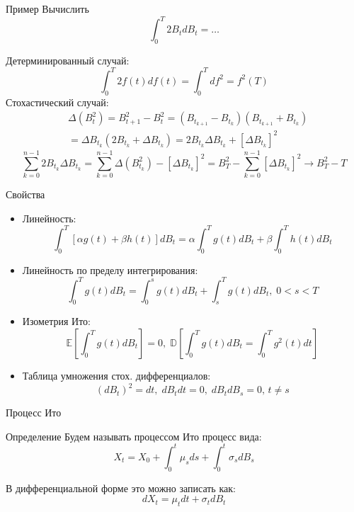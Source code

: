 \documentclass{beamer}
\begin{document}
\begin{frame}{Пример}
    Вычислить
    $$
        \int_0^T 2 B_t dB_t = \ldots
    $$
     
    Детерминированный случай:
    $$
        \int_0^T 2 f(t) df(t) = \int_0^T d f^2 = f^2(T)
    $$ 
    Стохастический случай:
    \begin{align*}
        &\Delta \left(B_t^2\right) = B_{t+1}^2 - B_t^2 = \left( B_{t_{k+1}}-B_{t_k} \right)
        \left( B_{t_{k+1}}+B_{t_k} \right)\\ 
        &= \Delta B_{t_k} \left( 2 B_{t_k} + \Delta B_{t_k}\right) = 2 B_{t_k} \Delta B_{t_k} + \left[\Delta B_{t_k}\right]^2
    \end{align*} 
    $$
        \sum_{k=0}^{n-1} 2 B_{t_k} \Delta B_{t_k} = 
        \sum_{k=0}^{n-1}\Delta \left(B_{t_k}^2\right) - \left[\Delta B_{t_k}\right]^2 = B_T^2 - \sum_{k=0}^{n-1} \left[\Delta B_{t_k}\right]^2 \to B_T^2 - T 
    $$
\end{frame}

\begin{frame}{Свойства}
    \begin{itemize}
        \item Линейность: $$\int_{0}^T \left[\alpha g(t) + \beta h(t)\right] dB_t = \alpha \int_0^T g(t) dB_t + \beta \int_0^T h(t) dB_t$$
        \item Линейность по пределу интегрирования:
        $$\int_0^T g(t) dB_t = \int_0^s g(t) dB_t + \int_s^T g(t) dB_t, \; 0 < s < T$$
        \item Изометрия Ито:
        $$
            \mathbb{E} \left[\int_0^T g(t) dB_t \right] = 0, \; \mathbb{D} \left[\int_0^T g(t) dB_t = \int_0^T g^2(t) dt\right]
        $$
        \item Таблица умножения стох. дифференциалов:
        $$
            (dB_t)^2 = dt,\; dB_t dt = 0, \; dB_t dB_s = 0, \, t\neq s 
        $$
    \end{itemize}
\end{frame}

\begin{frame}{Процесс Ито}
    \begin{block}{Определение}
        Будем называть процессом Ито процесс вида:
        $$
            X_t = X_0 + \int_0^t \mu_s ds + \int_0^t \sigma_s dB_s
        $$
    \end{block}
    В дифференциальной форме это можно записать как:
    $$
        dX_t = \mu_t dt + \sigma_t dB_t
    $$
\end{frame}
\end{document}

